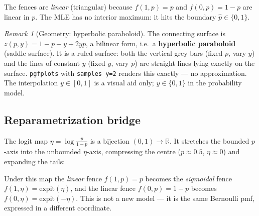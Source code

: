 \documentclass[12pt, a4paper]{article}
\theoremstyle{definition}
\theoremstyle{remark}
\newtheorem*{remark}{Remark}
\newcommand{\R}{\mathbb{R}}
\begin{document}
The fences are \emph{linear} (triangular) because
$f(1,p)=p$ and $f(0,p)=1-p$ are linear in $p$.
The MLE has no interior maximum: it hits the boundary
$\hat p \in \{0,1\}$.

\begin{remark}[Geometry: hyperbolic paraboloid]
\label{rem:saddle}
The connecting surface is
$z(p,y) = 1 - p - y + 2yp$, a bilinear form,
i.e.\ a \textbf{hyperbolic paraboloid} (saddle surface).
It is a ruled surface: both the vertical grey bars
(fixed $p$, vary $y$) and the lines of constant $y$
(fixed $y$, vary $p$) are straight lines lying exactly
on the surface.
\texttt{pgfplots} with \texttt{samples y=2} renders
this exactly --- no approximation.
The interpolation $y \in [0,1]$ is a visual aid only;
$y \in \{0,1\}$ in the probability model.
\end{remark}

\subsection{Reparametrization bridge}

The logit map $\eta = \log\frac{p}{1-p}$ is a bijection
$(0,1) \to \R$.  It stretches the bounded $p$-axis into
the unbounded $\eta$-axis, compressing the centre
($p \approx 0.5$, $\eta \approx 0$) and expanding the
tails:

\begin{center}
\end{center}

Under this map the \emph{linear} fence $f(1,p)=p$
becomes the \emph{sigmoidal} fence
$f(1,\eta)=\mathrm{expit}(\eta)$, and the linear
fence $f(0,p)=1-p$ becomes
$f(0,\eta)=\mathrm{expit}(-\eta)$.
This is not a new model --- it is the same Bernoulli
pmf, expressed in a different coordinate.
\end{document}
